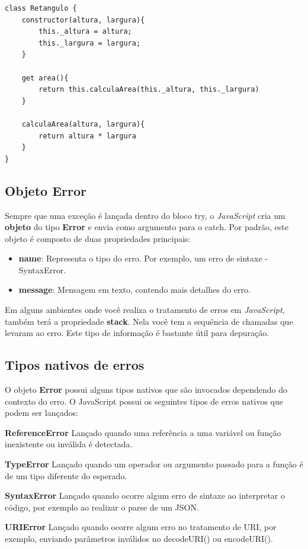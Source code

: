 \begin{verbatim}
class Retangulo { 
	constructor(altura, largura){
		this._altura = altura;
		this._largura = largura;
	}	
	
	get area(){
		return this.calculaArea(this._altura, this._largura)
	}
	
	calculaArea(altura, largura){
		return altura * largura
	}
}
\end{verbatim}

\subsection{Objeto Error}
Sempre que uma exceção é lançada dentro do bloco try, o \textit{JavaScript} cria um \textbf{objeto} do tipo \textbf{Error} e envia como argumento para o catch. Por padrão, este objeto é composto de duas propriedades principais:

\begin{itemize}
	\item \textbf{name}: Representa o tipo do erro. Por exemplo, um erro de sintaxe - SyntaxError.
	\item \textbf{message}: Mensagem em texto, contendo mais detalhes do erro.
\end{itemize}	

Em alguns ambientes onde você realiza o tratamento de erros em \textit{JavaScript}, também terá a propriedade \textbf{stack}. Nela você tem a sequência de chamadas que levaram ao erro. Este tipo de informação é bastante útil para depuração.

\subsection{Tipos nativos de erros}
O objeto \textbf{Error} possui alguns tipos nativos que são invocados dependendo do contexto do erro. O JavaScript possui os seguintes tipos de erros nativos que podem ser lançados:	

\textbf{ReferenceError}
Lançado quando uma referência a uma variável ou função inexistente ou inválida é detectada.

\textbf{TypeError}
Lançado quando um operador ou argumento passado para a função é de um tipo diferente do esperado.

\textbf{SyntaxError}
Lançado quando ocorre algum erro de sintaxe ao interpretar o código, por exemplo ao realizar o parse de um JSON.

\textbf{URIError}
Lançado quando ocorre algum erro no tratamento de URI, por exemplo, enviando parâmetros inválidos no decodeURI() ou encodeURI().

